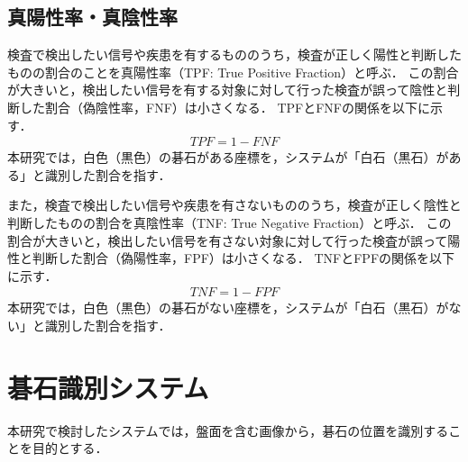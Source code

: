 \documentclass[openright]{nitocs}
\numberwithin{equation}{section}
\begin{document}
        \subsection{真陽性率・真陰性率} %
        検査で検出したい信号や疾患を有するもののうち，検査が正しく陽性と判断したものの割合のことを真陽性率（TPF: True Positive Fraction）と呼ぶ．
        この割合が大きいと，検出したい信号を有する対象に対して行った検査が誤って陰性と判断した割合（偽陰性率，FNF）は小さくなる．
        TPFとFNFの関係を以下に示す．
        \begin{align}
            TPF = 1-FNF
        \end{align}
        本研究では，白色（黒色）の碁石がある座標を，システムが「白石（黒石）がある」と識別した割合を指す．

        また，検査で検出したい信号や疾患を有さないもののうち，検査が正しく陰性と判断したものの割合を真陰性率（TNF: True Negative Fraction）と呼ぶ．
        この割合が大きいと，検出したい信号を有さない対象に対して行った検査が誤って陽性と判断した割合（偽陽性率，FPF）は小さくなる．
        TNFとFPFの関係を以下に示す．
        \begin{align}
            TNF = 1-FPF
        \end{align}
        本研究では，白色（黒色）の碁石がない座標を，システムが「白石（黒石）がない」と識別した割合を指す．

    \section{碁石識別システム} %
    \label{system}
        本研究で検討したシステムでは，盤面を含む画像から，碁石の位置を識別することを目的とする．
\end{document}
